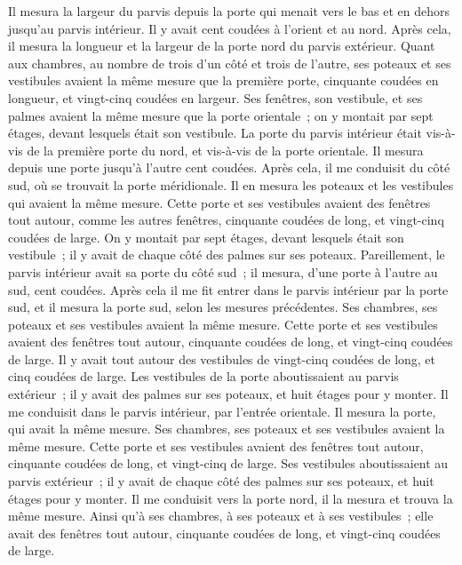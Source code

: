 \begin{multicols}{2}
Il mesura la largeur du parvis depuis la porte qui menait vers le bas et en dehors jusqu'au parvis intérieur. Il y avait cent coudées à l'orient et au nord.
Après cela, il mesura la longueur et la largeur de la porte nord du parvis extérieur.
Quant aux chambres, au nombre de trois d'un côté et trois de l'autre, ses poteaux et ses vestibules avaient la même mesure que la première porte, cinquante coudées en longueur, et vingt-cinq coudées en largeur.
Ses fenêtres, son vestibule, et ses palmes avaient la même mesure que la porte orientale~; on y montait par sept étages, devant lesquels était son vestibule.
La porte du parvis intérieur était vis-à-vis de la première porte du nord, et vis-à-vis de la porte orientale. Il mesura depuis une porte jusqu'à l'autre cent coudées.
Après cela, il me conduisit du côté sud, où se trouvait la porte méridionale. Il en mesura les poteaux et les vestibules qui avaient la même mesure.
Cette porte et ses vestibules avaient des fenêtres tout autour, comme les autres fenêtres, cinquante coudées de long, et vingt-cinq coudées de large.
On y montait par sept étages, devant lesquels était son vestibule~; il y avait de chaque côté des palmes sur ses poteaux.
Pareillement, le parvis intérieur avait sa porte du côté sud~; il mesura, d'une porte à l'autre au sud, cent coudées.
Après cela il me fit entrer dans le parvis intérieur par la porte sud, et il mesura la porte sud, selon les mesures précédentes.
Ses chambres, ses poteaux et ses vestibules avaient la même mesure. Cette porte et ses vestibules avaient des fenêtres tout autour, cinquante coudées de long, et vingt-cinq coudées de large.
Il y avait tout autour des vestibules de vingt-cinq coudées de long, et cinq coudées de large.
Les vestibules de la porte aboutissaient au parvis extérieur~; il y avait des palmes sur ses poteaux, et huit étages pour y monter.
Il me conduisit dans le parvis intérieur, par l'entrée orientale. Il mesura la porte, qui avait la même mesure.
Ses chambres, ses poteaux et ses vestibules avaient la même mesure. Cette porte et ses vestibules avaient des fenêtres tout autour, cinquante coudées de long, et vingt-cinq de large.
Ses vestibules aboutissaient au parvis extérieur~; il y avait de chaque côté des palmes sur ses poteaux, et huit étages pour y monter.
Il me conduisit vers la porte nord, il la mesura et trouva la même mesure.
Ainsi qu'à ses chambres, à ses poteaux et à ses vestibules~; elle avait des fenêtres tout autour, cinquante coudées de long, et vingt-cinq coudées de large.

\end{multicols}
